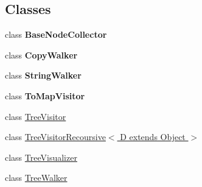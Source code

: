 \subsection*{Classes}
\begin{DoxyCompactItemize}
\item 
class {\bfseries Base\-Node\-Collector}
\item 
class {\bfseries Copy\-Walker}
\item 
class {\bfseries String\-Walker}
\item 
class {\bfseries To\-Map\-Visitor}
\item 
class \hyperlink{classit_1_1emarolab_1_1cagg_1_1core_1_1BaseNode_1_1TreeVisitor}{Tree\-Visitor}
\item 
class \hyperlink{classit_1_1emarolab_1_1cagg_1_1core_1_1BaseNode_1_1TreeVisitorRecoursive_3_01D_01extends_01Object_01_4}{Tree\-Visitor\-Recoursive$<$ D extends Object $>$}
\item 
class \hyperlink{classit_1_1emarolab_1_1cagg_1_1core_1_1BaseNode_1_1TreeVisualizer}{Tree\-Visualizer}
\item 
class \hyperlink{classit_1_1emarolab_1_1cagg_1_1core_1_1BaseNode_1_1TreeWalker}{Tree\-Walker}
\end{DoxyCompactItemize}
